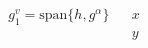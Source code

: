 \documentclass{article}
\def \span { {\mathrm{span}} }
\begin{document}
\begin{eqnarray}
g^{v}_1 = \span \{ h, g^\alpha \} && x \nonumber\\
&& y
\end{eqnarray}
\end{document}
